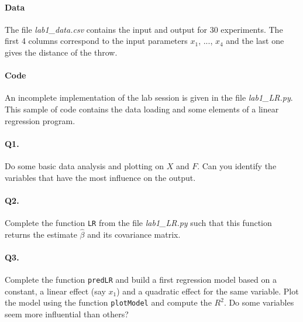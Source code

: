 \documentclass[12pt]{scrartcl}
\begin{document}
\paragraph{Data} The file \emph{lab1\_data.csv} contains the input and output for 30 experiments. The first 4 columns correspond to the input parameters $x_1$, ..., $x_4$ and the last one gives the distance of the throw.

\paragraph{Code} An incomplete implementation of the lab session is given in the file \emph{lab1\_LR.py}. This sample of code contains the data loading and some elements of a linear regression program.

\paragraph{Q1.} Do some basic data analysis and plotting on $X$ and $F$. Can you identify the variables that have the most influence on the output.

\paragraph{Q2.} Complete the function \texttt{LR} from the file \emph{lab1\_LR.py} such that this function returns the estimate $\hat{\beta}$ and its covariance matrix.

\paragraph{Q3.} Complete the function \texttt{predLR} and build a first regression model based on a constant, a linear effect (say $x_1$) and a quadratic effect for the same variable. Plot the model using the function \texttt{plotModel} and compute the $R^2$. Do some variables seem more influential than others?
\end{document}
